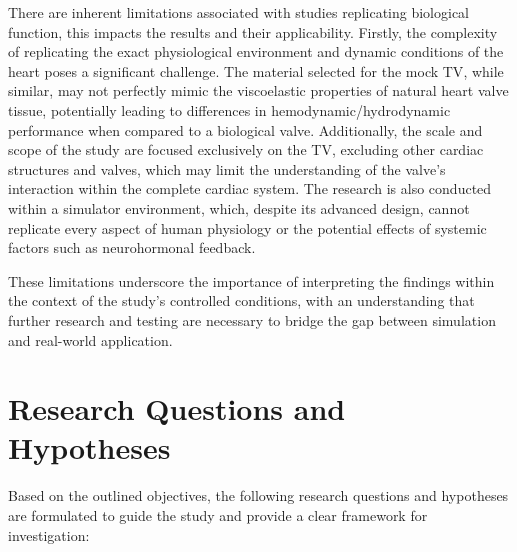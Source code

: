 There are inherent limitations associated with studies replicating biological function, this impacts the results and their applicability. Firstly, the complexity of replicating the exact physiological environment and dynamic conditions of the heart poses a significant challenge. The material selected for the mock \gls{TV}, while similar, may not perfectly mimic the viscoelastic properties of natural heart valve tissue, potentially leading to differences in hemodynamic/hydrodynamic performance when compared to a biological valve. Additionally, the scale and scope of the study are focused exclusively on the \gls{TV}, excluding other cardiac structures and valves, which may limit the understanding of the valve's interaction within the complete cardiac system. The research is also conducted within a simulator environment, which, despite its advanced design, cannot replicate every aspect of human physiology or the potential effects of systemic factors such as neurohormonal feedback. \cite{chatterjeeNeurohormonalActivationCongestive2005}

These limitations underscore the importance of interpreting the findings within the context of the study's controlled conditions, with an understanding that further research and testing are necessary to bridge the gap between simulation and real-world application.

\section{Research Questions and Hypotheses}

Based on the outlined objectives, the following research questions and hypotheses are formulated to guide the study and provide a clear framework for investigation:

